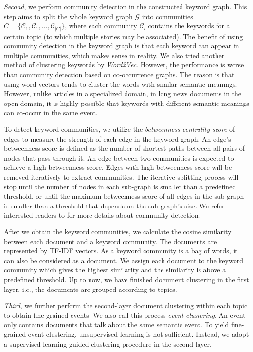 \textit{Second}, we perform community detection in the constructed keyword graph. This step aims to split the whole keyword graph $\mathcal{G}$ into communities $C = \{\mathcal{C}_1, \mathcal{C}_1, ..., \mathcal{C}_{|C|}\}$, where each community $\mathcal{C}_i$ contains the keywords for a certain topic (to which multiple stories may be associated). 
The benefit of using community detection in the keyword graph is that each keyword can appear in multiple communities, which makes sense in reality. 
We also tried another method of clustering keywords by \textit{Word2Vec}.
However, the performance is worse than community detection based on co-occurrence graphs. The reason is that using word vectors tends to cluster the words with similar semantic meanings. However, unlike articles in a specialized domain, in long news documents in the open domain, it is highly possible that keywords with different semantic meanings can co-occur in the same event.

To detect keyword communities, we utilize the \emph{betweenness centrality score} \cite{sayyadi2013graph} of edges to measure the strength of each edge in the keyword graph. An edge's betweenness score is defined as the number of shortest paths between all pairs of nodes that pass through it. An edge between two communities is expected to achieve a high betweenness score. Edges with high betweenness score will be removed iteratively to extract communities. The iterative splitting process will stop until the number of nodes in each sub-graph is smaller than a predefined threshold, or until the maximum betweenness score of all edges in the sub-graph is smaller than a threshold that depends on the sub-graph's size. We refer interested readers to \cite{sayyadi2013graph} for more details about community detection.

After we obtain the keyword communities, we calculate the cosine similarity between each document and a keyword community.  The documents are represented by TF-IDF vectors. As a keyword community is a bag of words, it can also be considered as a document. We assign each document to the keyword community which gives the highest similarity and the similarity is above a predefined threshold. Up to now, we have finished document clustering in the first layer, i.e., the documents are grouped according to topics. 

\textit{Third}, we further perform the second-layer document clustering within each topic to obtain fine-grained events. We also call this process \emph{event clustering}. An event only contains documents that talk about the same semantic event. To yield fine-grained event clustering, unsupervised learning is not sufficient. 
Instead, we adopt a supervised-learning-guided clustering procedure in the second layer.



